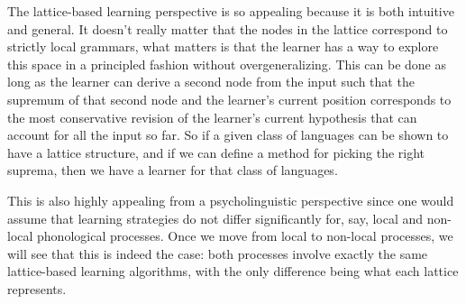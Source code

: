 The lattice-based learning perspective is so appealing because it is both intuitive and general.
It doesn't really matter that the nodes in the lattice correspond to strictly local grammars, what matters is that the learner has a way to explore this space in a principled fashion without overgeneralizing.
This can be done as long as the learner can derive a second node from the input such that the supremum of that second node and the learner's current position corresponds to the most conservative revision of the learner's current hypothesis that can account for all the input so far.
So if a given class of languages can be shown to have a lattice structure, and if we can define a method for picking the right suprema, then we have a learner for that class of languages.

This is also highly appealing from a psycholinguistic perspective since one would assume that learning strategies do not differ significantly for, say, local and non-local phonological processes.
Once we move from local to non-local processes, we will see that this is indeed the case: both processes involve exactly the same lattice-based learning algorithms,  with the only difference being what each lattice represents.
